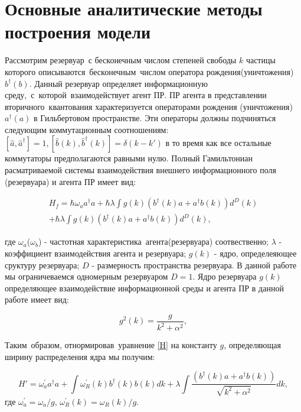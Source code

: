 \chapter{Основные аналитические методы построения модели}

Рассмотрим резервуар~с бесконечным числом степеней свободы $k$ частицы которого описываются~бесконечным~числом
оператора рождения(уничтожения) $b^\dagger(b)$.
Данный резервуар определяет информационную среду,~с~которой~взаимодействует агент ПР.
ПР агента в представлении вторичного~квантования характеризуется операторами рождения (уничтожения)
$a^\dagger(a)$ в Гильбертовом пространстве.
Эти операторы должны подчиняться следующим коммутационным соотношениям:
$
[\hat{a}, \hat{a}^{\dagger}] = 1,
[\hat{b}(k), \hat{b}^{\dagger}(k)] = \delta (k-k')
$
в то время как все остальные коммутаторы предполагаются равными нулю.
Полный Гамильтониан расматриваемой системы взаимодействия внешнего информационного поля (резервуара) и агента ПР имеет вид:

\begin{multline}\label{H}
H_f = \hbar \omega_a a^{\dagger} a + \hbar \lambda \int g(k) (b^{\dagger}(k) a + a^{\dagger} b(k)) d^{D}(k) \\
+ \hbar \lambda \int g(k) (b^{\dagger}(k) a + a^{\dagger} b(k)) d^{D}(k),
\end{multline}

где ${\omega_a}$($\omega_b$) - частотная характеристика~агента(резервуара) соотвественно; $\lambda$
- коэффициент взаимодействия агента и резервуара; $g(k)$ - ядро, определеяющее сруктуру резервуара;
$D$ - размерность пространства резервуара.
В данной работе мы ограничеваемся одномерным резервуаром $D=1$.
Ядро резервуара $g(k)$ определяющее взаимодействие информационной среды и агента ПР в данной работе имеет вид:

\begin{equation}
    g^{2}(k) = \frac{g}{k^{2} + \alpha^{2}},
\end{equation}

Таким~образом, отнормировав~уравнение \eqref{H} на константу $g$, определяющая ширину распределения
ядра мы получим:

\begin{equation}\label{H'}
H' =  \omega^{'}_a a^{\dagger} a +  \int \omega^{'}_{R}(k) b^{\dagger}(k) b(k) dk+ \lambda \int \frac{(b^{\dagger}(k) a + a^{\dagger} b(k))}{\sqrt{k^{2} + \alpha^{2}}} dk,
\end{equation}
где $\omega^{'}_a = \omega_a/g$, $\omega^{'}_{R}(k) = \omega_{R}(k)/g$.

